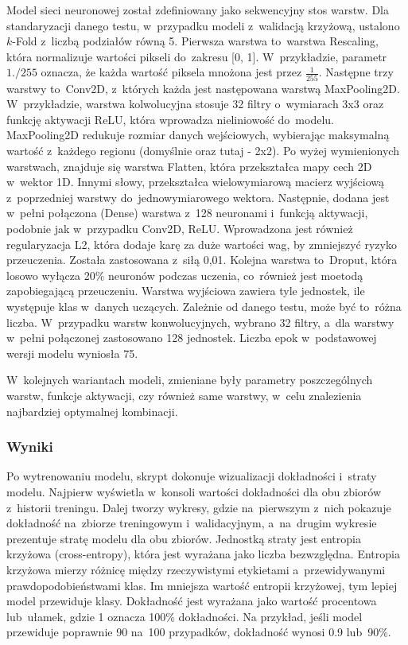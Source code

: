 Model sieci neuronowej został zdefiniowany jako sekwencyjny stos warstw.
Dla standaryzacji danego testu, w~przypadku modeli z~walidacją krzyżową, ustalono $k$-Fold z~liczbą podziałów równą 5.
Pierwsza warstwa to~warstwa Rescaling, która normalizuje wartości pikseli do~zakresu [0, 1].
W~przykładzie, parametr $1./255$ oznacza, że każda wartość piksela mnożona jest przez $\frac{1}{255}$.
Następne trzy warstwy to~Conv2D, z~których każda jest następowana warstwą MaxPooling2D.
W~przykładzie, warstwa kolwolucyjna stosuje 32 filtry o~wymiarach 3x3 oraz funkcję aktywacji ReLU,
która wprowadza nieliniowość do~modelu.
MaxPooling2D redukuje rozmiar danych wejściowych,
wybierając maksymalną wartość z~każdego regionu (domyślnie oraz tutaj - 2x2). 
Po wyżej wymienionych warstwach, znajduje się warstwa Flatten, która przekształca mapy cech 2D w~wektor 1D.
Innymi słowy, przekształca wielowymiarową macierz wyjściową z~poprzedniej warstwy do~jednowymiarowego wektora.
Następnie, dodana jest w~pełni połączona (Dense) warstwa z~128 neuronami
i~funkcją aktywacji, podobnie jak w~przypadku Conv2D, ReLU.
Wprowadzona jest również regularyzacja L2, która dodaje karę za duże wartości wag,
by zmniejszyć ryzyko przeuczenia. Została zastosowana z~siłą 0,01.
Kolejna warstwa to~Droput, która losowo wyłącza 20\% neuronów podczas uczenia,
co~również jest moetodą zapobiegającą przeuczeniu.
Warstwa wyjściowa zawiera tyle jednostek, ile występuje klas w~danych uczących.
Zależnie od danego testu, może być to~różna liczba.
W~przypadku warstw konwolucyjnych, wybrano 32 filtry, a~dla warstwy w~pełni połączonej zastosowano 128 jednostek.
Liczba epok w~podstawowej wersji modelu wyniosła 75.

W~kolejnych wariantach modeli, zmieniane były parametry poszczególnych warstw, funkcje aktywacji,
czy również same warstwy, w~celu znalezienia najbardziej optymalnej kombinacji.

\subsubsection{Wyniki}
Po wytrenowaniu modelu, skrypt dokonuje wizualizacji dokładności i~straty modelu.
Najpierw wyświetla w~konsoli wartości dokładności dla obu zbiorów z~historii treningu.
Dalej tworzy wykresy, gdzie na~pierwszym z~nich pokazuje dokładność na~zbiorze treningowym i~walidacyjnym,
a~na~drugim wykresie prezentuje stratę modelu dla obu zbiorów.
Jednostką straty jest entropia krzyżowa (cross-entropy), która jest wyrażana jako liczba bezwzględna.
Entropia krzyżowa mierzy różnicę między rzeczywistymi etykietami a~przewidywanymi prawdopodobieństwami klas.
Im mniejsza wartość entropii krzyżowej, tym lepiej model przewiduje klasy.
Dokładność jest wyrażana jako wartość procentowa lub~ułamek, gdzie 1 oznacza 100\% dokładności.
Na przykład, jeśli model przewiduje poprawnie 90 na~100 przypadków, dokładność wynosi 0.9 lub~90\%.

